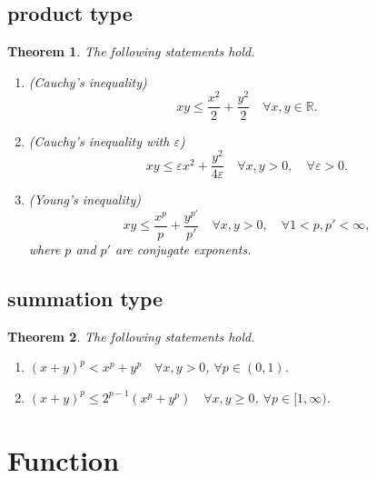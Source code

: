 \documentclass[11pt,a4paper]{report}
\newtheorem{theorem}{Theorem}[section]
\theoremstyle{definition}
\begin{document}
\subsection{product type}

\begin{theorem}
	The following statements hold.
	\begin{enumerate}[label=(\alph*)] 
		\rm\item (Cauchy's inequality) \\[0.1cm]
		\begin{equation*} 
			xy \leq \frac{x^{2}}{2}+\frac{y^{2}}{2} \quad \forall x, y \in \mathbb{R}.
		\end{equation*}
		\rm\item (Cauchy's inequality with $\varepsilon$)\\[0.1cm]
		\begin{equation*} 
			xy \leq \varepsilon x^{2}+\frac{y^{2}}{4 \varepsilon} \quad \forall x, y>0, \quad \forall \varepsilon>0.
		\end{equation*}
		\rm\item (Young's inequality)\\[0.1cm]
		\begin{equation*} 
			xy \leq \frac{x^p}{p} + \frac{y^{p'}}{p'} \quad \forall x, y>0, \quad  \forall 1 < p, p' < \infty,
		\end{equation*}
		where $p$ and $p'$ are conjugate exponents.
	\end{enumerate}
\end{theorem}

\subsection{summation type}

\begin{theorem}
	The following statements hold.
	\begin{enumerate}[label=(\alph*)] 
		\rm\item $(x+y)^{p} < x^{p}+y^{p} \quad \forall x, y > 0$, $\forall p \in (0, 1)$.
		\rm\item $(x + y)^{p} \leq 2^{p - 1}\left(x^{p} + y^{p}\right) \quad \forall x, y \geq 0$, $\forall p \in [1, \infty)$.
	\end{enumerate}
\end{theorem}
\section{Function}
\end{document}
